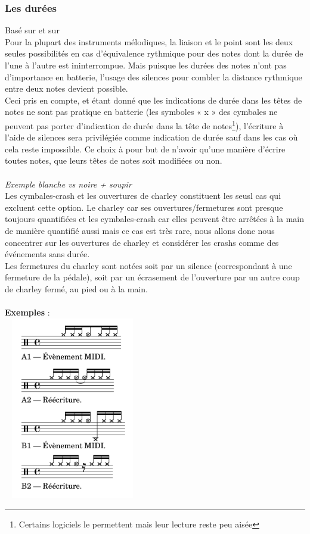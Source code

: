 \subsubsection{Les durées}
Basé sur \cite{jacquemard:hal-01134096} et sur \cite{jacquemard:hal-01403982}\\
Pour la plupart des instruments mélodiques, la liaison et le point sont les deux seules possibilités en cas d’équivalence rythmique pour des notes dont la durée de l’une à l’autre est ininterrompue. Mais puisque les durées des notes n’ont pas d’importance en batterie, l’usage des silences pour combler la distance rythmique entre deux notes devient possible.\\
Ceci pris en compte, et étant donné que les indications de durée dans les têtes de notes ne sont pas pratique en batterie (les symboles « x » des cymbales ne
peuvent pas porter d’indication de durée dans la tête de notes\footnote{Certains logiciels le permettent mais leur lecture reste peu aisée}), l’écriture à l’aide de silences sera privilégiée comme indication de durée sauf dans les cas où cela reste impossible. Ce choix à pour but de n’avoir qu’une manière d’écrire toutes notes, que leurs têtes de notes soit modifiées ou non.\\\\
\textit{Exemple blanche vs noire + soupir}\\

Les cymbales-crash et les ouvertures de charley constituent les seusl cas qui excluent cette option. Le charley car ses ouvertures/fermetures sont presque toujours quantifiées et les cymbales-crash car elles peuvent être arrêtées à la main de manière quantifié aussi mais ce cas est très rare, nous allons donc nous concentrer sur les ouvertures de charley et considérer les crashs comme des événements sans durée.\\
Les fermetures du charley sont notées soit par un silence (correspondant à une fermeture de la pédale), soit par un écrasement de l’ouverture par un autre coup de charley fermé, au pied ou à la main.\\\\
\textbf{Exemples} :\\
\includegraphics[height=80mm, width=60mm]{z_images/reecriture/exemples_charley_1.png}

